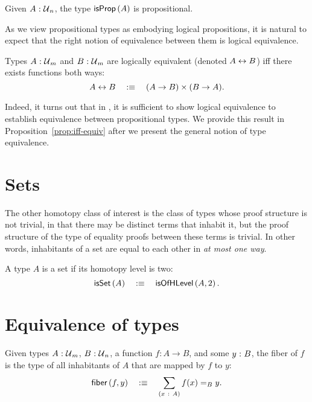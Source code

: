 \begin{prop}
  Given $A\hspace{0.1mm}:\hspace{0.1mm}\mathcal{U}{}_n$, the type $\mathsf{isProp}\left(A\right)$ is propositional.
\end{prop}

As we view propositional types as embodying logical propositions, it is natural to
expect that the right notion of equivalence between them is logical equivalence.

\begin{defn}\label{defn:iff}
  Types $A\hspace{0.1mm}:\hspace{0.1mm}\mathcal{U}{}_m$ and $B\hspace{0.1mm}:\hspace{0.1mm}\mathcal{U}{}_m$ are logically equivalent
  (denoted $A \leftrightarrow B$) iff there exists functions both ways:
  \begin{equation*}
    A \leftrightarrow B \quad:\equiv\quad (A \rightarrow B) \times (B \rightarrow A).
  \end{equation*}
\end{defn}

Indeed, it turns out that in \UF{}, it is sufficient to show logical equivalence to
establish equivalence between propositional types. We provide this result in
Proposition~\ref{prop:iff-equiv} after we present the general notion of type equivalence.

\section{Sets}

The other homotopy class of interest is the class of types whose proof structure is not
trivial, in that there may be distinct terms that inhabit it, but the proof structure of
the type of equality proofs between these terms is trivial. In other words, inhabitants of
a set are equal to each other in \emph{at most one way}.

\begin{defn}[Set]\label{defn:hset}
  A type $A$ is a set if its homotopy level is two:
  \begin{equation*}
    \mathsf{isSet}\left(A\right) \quad:\equiv\quad \mathsf{isOfHLevel}\left(A, 2\right).
  \end{equation*}
\end{defn}

\section{Equivalence of types}

\begin{defn}[Fiber]
  Given types $A\hspace{0.1mm}:\hspace{0.1mm}\mathcal{U}{}_m$, $B\hspace{0.1mm}:\hspace{0.1mm}\mathcal{U}{}_n$, a function
  $f : A \rightarrow B$, and some $y\hspace{0.1mm}:\hspace{0.1mm}B$, the fiber of $f$ is the type of all inhabitants
  of $A$ that are mapped by $f$ to $y$:
  \begin{equation*}
    \mathsf{fiber}\left(f, y\right) \quad:\equiv\quad \sum_{(x~:~A)} f(x) =_B y.
  \end{equation*}
\end{defn}

